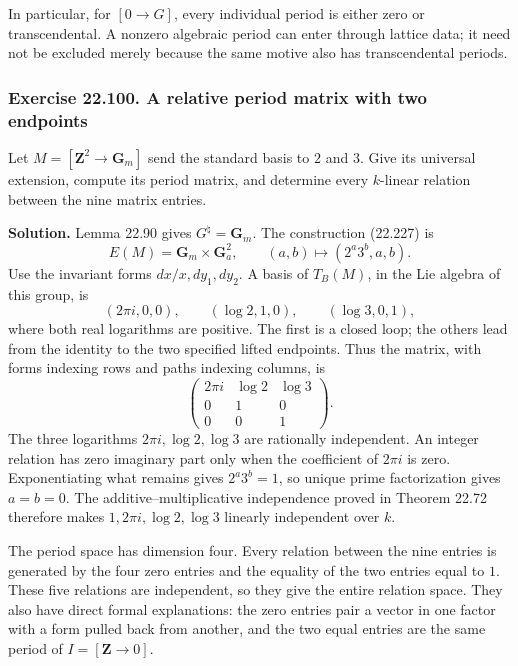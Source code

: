 \documentclass[
  11pt,
  a4paper,
]{article}
\begin{document}
In particular, for \([0\to G]\), every individual period is either zero
or transcendental. A nonzero algebraic period can enter through lattice
data; it need not be excluded merely because the same motive also has
transcendental periods.

\subsubsection{Exercise 22.100. A relative period matrix with two
endpoints}\label{exercise-22.100.-a-relative-period-matrix-with-two-endpoints}

Let \(M=[\mathbf Z^2\to\mathbf G_m]\) send the standard basis to \(2\)
and \(3\). Give its universal extension, compute its period matrix, and
determine every \(k\)-linear relation between the nine matrix entries.

\textbf{Solution.} Lemma 22.90 gives \(G^\natural=\mathbf G_m\). The
construction (22.227) is \[
 E(M)=\mathbf G_m\times\mathbf G_a^2,\qquad
 (a,b)\longmapsto(2^a3^b,a,b).
 \tag{22.248}
\] Use the invariant forms \(dx/x,dy_1,dy_2\). A basis of \(T_B(M)\), in
the Lie algebra of this group, is \[
 (2\pi i,0,0),\qquad(\log2,1,0),\qquad(\log3,0,1),
 \tag{22.249}
\] where both real logarithms are positive. The first is a closed loop;
the others lead from the identity to the two specified lifted endpoints.
Thus the matrix, with forms indexing rows and paths indexing columns, is
\[
 \begin{pmatrix}
 2\pi i&\log2&\log3\\
 0&1&0\\
 0&0&1
 \end{pmatrix}.
 \tag{22.250}
\] The three logarithms \(2\pi i,\log2,\log3\) are rationally
independent. An integer relation has zero imaginary part only when the
coefficient of \(2\pi i\) is zero. Exponentiating what remains gives
\(2^a3^b=1\), so unique prime factorization gives \(a=b=0\). The
additive--multiplicative independence proved in Theorem 22.72 therefore
makes \(1,2\pi i,\log2,\log3\) linearly independent over \(k\).

The period space has dimension four. Every relation between the nine
entries is generated by the four zero entries and the equality of the
two entries equal to \(1\). These five relations are independent, so
they give the entire relation space. They also have direct formal
explanations: the zero entries pair a vector in one factor with a form
pulled back from another, and the two equal entries are the same period
of \(I=[\mathbf Z\to0]\).
\end{document}
